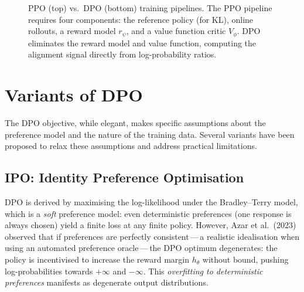 \begin{figure}[ht]
\caption{PPO (top) vs.\ DPO (bottom) training pipelines. The PPO pipeline requires four components: the reference policy (for KL), online rollouts, a reward model $r_\psi$, and a value function critic $V_\phi$. DPO eliminates the reward model and value function, computing the alignment signal directly from log-probability ratios.}
\label{fig:dpo-vs-ppo}
\end{figure}

\section{Variants of DPO}
\label{sec:dpo-variants}

The DPO objective, while elegant, makes specific assumptions about the preference model and the nature of the training data. Several variants have been proposed to relax these assumptions and address practical limitations.

\subsection{IPO: Identity Preference Optimisation}

DPO is derived by maximising the log-likelihood under the Bradley--Terry model, which is a \emph{soft} preference model: even deterministic preferences (one response is always chosen) yield a finite loss at any finite policy. However, Azar et al.\ (2023) observed that if preferences are perfectly consistent\,---\,a realistic idealisation when using an automated preference oracle\,---\,the DPO optimum degenerates: the policy is incentivised to increase the reward margin $h_\theta$ without bound, pushing log-probabilities towards $+\infty$ and $-\infty$. This \emph{overfitting to deterministic preferences} manifests as degenerate output distributions.

